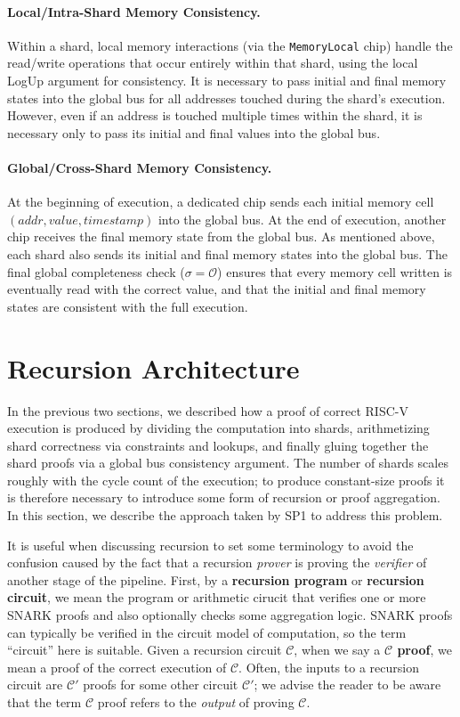 \documentclass[11pt]{article}
\begin{document}
\paragraph{Local/Intra-Shard Memory Consistency.}
Within a shard, local memory interactions (via the \texttt{MemoryLocal}
chip) handle the read/write operations that occur entirely within that
shard, using the local LogUp argument for consistency.
It is necessary to pass initial and final memory states into the global bus for all addresses touched
during the shard's execution. However, even if an address is touched multiple times within the shard,
it is necessary only to pass its initial and final values into the global bus.

\paragraph{Global/Cross-Shard Memory Consistency.}
At the beginning of execution, a dedicated chip sends each initial memory cell
$(addr, value, timestamp)$ into the global bus.
At the end of execution, another chip receives
the final memory state from the global bus.
As mentioned above, each shard also sends its initial and final memory states into the global bus.
The final global completeness check ($\sigma = \mathcal{O}$) ensures that
every memory cell written is eventually read with the correct value,
and that the initial and final memory states are consistent with the
full execution.


\section{Recursion Architecture}\label{sec:proof-arch}
In the previous two sections, we described how a proof of correct RISC-V execution is produced by
dividing the computation into shards, arithmetizing shard correctness via constraints and lookups,
and finally gluing together the shard proofs via a global bus consistency argument.
The number of shards scales roughly with the cycle count of the execution; to produce constant-size
proofs it is therefore necessary to introduce some form of recursion or proof aggregation.
In this section, we describe the approach taken by SP1 to address this problem.

It is useful when discussing recursion to set some terminology
to avoid the confusion caused by the fact that a recursion \emph{prover} is proving the \emph{verifier} of another
stage of the pipeline.
First, by a \textbf{recursion program} or \textbf{recursion circuit}, we mean the program or arithmetic cirucit that verifies
one or more SNARK proofs and also optionally checks some aggregation logic.
SNARK proofs can typically be verified in the circuit model of computation, so the term ``circuit'' here is suitable.
Given a recursion circuit $\mathcal C$, when we say a \textbf{$\mathcal C$ proof}, we mean a proof of the correct
execution of $\mathcal C$.
Often, the inputs to a recursion circuit are $\mathcal{C}'$ proofs for some other circuit $\mathcal C'$;
we advise the reader to be aware that the term $\mathcal C$ proof refers to the \emph{output} of proving
$\mathcal C$.
\end{document}
